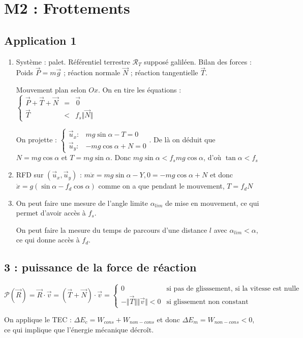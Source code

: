 \documentclass[a4paper,12pt]{book}
\begin{document}
\section{M2 : Frottements}
\subsection{Application 1}
\begin{enumerate}
\item Système : palet. Référentiel terrestre $\mathcal{R}_T$ supposé galiléen. Bilan des forces : Poids $\vec{P} = m\vec{g}$ ; réaction normale $\vec{N}$ ; réaction tangentielle $\vec{T}$.
\par Mouvement plan selon $Ox$. On en tire les équations : $\left\{\begin{array}{rcl} \vec{P} + \vec{T} +\vec{N} & = & \vec{0} \\ \vec{T} &<& f_s\Vert\vec{N}\Vert \end{array}\right.$
\par On projette : $\left\{\begin{array}{rl} \vec{u}_x : & mg\sin\alpha - T = 0\\ \vec{u}_y : & -mg\cos\alpha +N = 0\end{array}\right.$. De là on déduit que $N=mg\cos\alpha$ et $T = mg\sin\alpha$. Donc $mg\sin\alpha<f_smg\cos\alpha$, d'où $\tan\alpha<f_s$
\item RFD sur $(\vec{u}_x, \vec{u}_y)$ : $m\ddot{x} = mg\sin\alpha - Y, 0 = -mg\cos\alpha + N$ et donc $\ddot{x} = g(\sin\alpha - f_d\cos\alpha)$ comme on a que pendant le mouvement, $T=f_dN$
\item On peut faire une mesure de l'angle limite $\alpha_{lim}$ de mise en mouvement, ce qui permet d'avoir accès à $f_s$.
\par On peut faire la mesure du temps de parcours d'une distance $l$ avec $\alpha_{lim}<\alpha$, ce qui donne accès à $f_d$.
\end{enumerate}

\subsection{3 : puissance de la force de réaction}
$\mathcal{P}(\vec{R}) = \vec{R}\cdot\vec{v} = (\vec{T} + \vec{N})\cdot\vec{v} = \left\{\begin{array}{lr} 0 & \text{si pas de glisssement, si la vitesse est nulle} \\ -\Vert\vec{T}\Vert\Vert\vec{v}\Vert<0 & \text{si glissement non constant}\end{array}\right.$
\par On applique le TEC : $\Delta E_c = W_{cons} + W_{non-cons}$ et donc $\Delta E_m = W_{non-cons} <0$, ce qui implique que l'énergie mécanique décroît.
\end{document}
